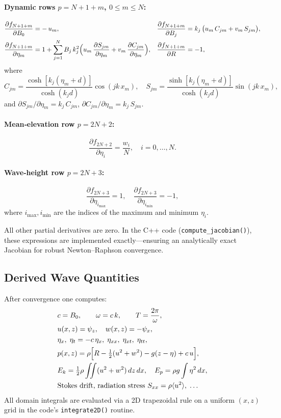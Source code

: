 \documentclass{article}
\begin{document}
\paragraph{Dynamic rows \(p=N+1+m\), \(0\le m\le N\):}
\begin{align}
\frac{\partial f_{N+1+m}}{\partial B_{0}}
  &= -\,u_{m},
  &
\frac{\partial f_{N+1+m}}{\partial B_{j}}
  &= k_{j}\,\bigl(u_{m}\,C_{jm} + v_{m}\,S_{jm}\bigr),
  \\
\frac{\partial f_{N+1+m}}{\partial \eta_{m}}
  &= 1
     + \sum_{j=1}^{N}
       B_{j}\,k_{j}^{2}
       \Bigl(u_{m}\,\frac{\partial S_{jm}}{\partial \eta_{m}}
           + v_{m}\,\frac{\partial C_{jm}}{\partial \eta_{m}}\Bigr),
  &
\frac{\partial f_{N+1+m}}{\partial R}
  &= -1,
\end{align}
where
\[
C_{jm} = \frac{\cosh[k_{j}(\eta_{m}+d)]}{\cosh(k_{j}d)}\cos(jk\,x_{m}), 
\quad
S_{jm} = \frac{\sinh[k_{j}(\eta_{m}+d)]}{\cosh(k_{j}d)}\sin(jk\,x_{m}),
\]
and
\(\partial S_{jm}/\partial \eta_{m} = k_{j} \,C_{jm}\), 
\(\partial C_{jm}/\partial \eta_{m} = k_{j} \,S_{jm}.\)

\paragraph{Mean‐elevation row \(p=2N+2\):}
\[
\frac{\partial f_{2N+2}}{\partial \eta_{i}}
  = \frac{w_i}{N},\quad i=0,\dots,N.
\]

\paragraph{Wave‐height row \(p=2N+3\):}
\[
\frac{\partial f_{2N+3}}{\partial \eta_{i_{\max}}} = 1,
\quad
\frac{\partial f_{2N+3}}{\partial \eta_{i_{\min}}} = -1,
\]
where \(i_{\max},i_{\min}\) are the indices of the maximum and minimum \(\eta_{i}\).

\medskip
All other partial derivatives are zero.  In the C++ code (\texttt{compute\_jacobian()}), these expressions are implemented exactly—ensuring an analytically exact Jacobian for robust Newton–Raphson convergence.

\subsection{Derived Wave Quantities}

After convergence one computes:
\begin{align*}
& c = B_0,\qquad \omega = c\,k,\qquad T=\frac{2\pi}{\omega},\\
& u(x,z)=\psi_z,\quad 
  w(x,z)=-\psi_x,\\
& \eta_x,\;\eta_t=-c\,\eta_x,\;\eta_{xx},\;\eta_{xt},\;\eta_{tt},\\
& p(x,z)=\rho\Bigl[R-\tfrac12(u^2+w^2)-g(z-\eta)+c\,u\Bigr],\\
& E_k = \tfrac12\rho\iint (u^2+w^2)\,dz\,dx,
\quad
E_p = \rho g\int \eta^2\,dx,\\
&\text{Stokes drift, radiation stress }
S_{xx}=\rho\langle u^2\rangle,\;\dots
\end{align*}
All domain integrals are evaluated via a 2D trapezoidal rule on a uniform $(x,z)$ grid in the code’s \verb|integrate2D()| routine.
\end{document}
